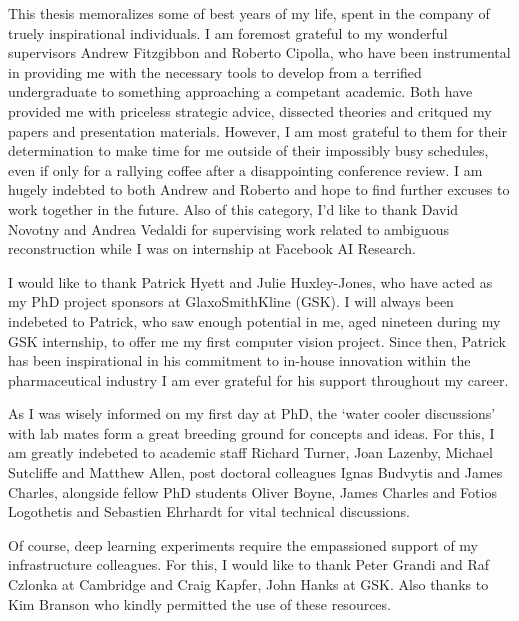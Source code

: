 
\begin{acknowledgements}      


This thesis memoralizes some of best years of my life, spent in the company of truely inspirational individuals. I am foremost grateful to my wonderful supervisors Andrew Fitzgibbon and Roberto Cipolla, who have been instrumental in providing me with the necessary tools to develop from a terrified undergraduate to something approaching a competant academic. 
Both have provided me with priceless strategic advice, dissected theories and critqued my papers and presentation materials. However, I am most grateful to them for their determination to make time for me outside of their impossibly busy schedules, even if only for a rallying coffee after a disappointing conference review. I am hugely indebted to both Andrew and Roberto and hope to find further excuses to work together in the future. Also of this category, I'd like to thank David Novotny and Andrea Vedaldi for supervising work related to ambiguous reconstruction while I was on internship at Facebook AI Research.

I would like to thank Patrick Hyett and Julie Huxley-Jones, who have acted as my PhD project sponsors at GlaxoSmithKline (GSK). I will always been indebeted to Patrick, who saw enough potential in me, aged nineteen during my GSK internship, to offer me my first computer vision project. Since then, Patrick has been inspirational in his commitment to in-house innovation within the pharmaceutical industry I am ever grateful for his support throughout my career.

As I was wisely informed on my first day at PhD, the `water cooler discussions' with lab mates form a great breeding ground for concepts and ideas. For this, I am greatly indebeted to academic staff Richard Turner, Joan Lazenby, Michael Sutcliffe and Matthew Allen, post doctoral colleagues Ignas Budvytis and James Charles, alongside fellow PhD students Oliver Boyne, James Charles and Fotios Logothetis and Sebastien Ehrhardt for vital technical discussions.

Of course, deep learning experiments require the empassioned support of my infrastructure colleagues. For this, I would like to thank Peter Grandi and Raf Czlonka at Cambridge and Craig Kapfer, John Hanks at GSK. Also thanks to Kim Branson who kindly permitted the use of these resources.


\end{acknowledgements}
